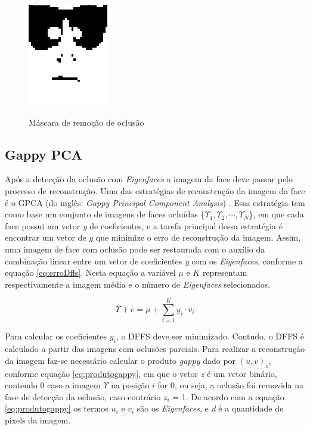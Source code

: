 \begin{figure}[H]
\centering
\caption{Máscara de remoção de oclusão}
\includegraphics[scale = 0.62]{imgs/mascara.png}
\label{fig:mascara}
\end{figure}




\subsection{Gappy PCA}
Após a detecção da oclusão com \textit{Eigenfaces} a imagem da face deve passar pelo processo de reconstrução. Uma das estratégias de reconstrução da imagem da face é o GPCA (do inglês: \textit{Gappy Principal Component Analysis}) \cite{colombo2009gappy}. Essa estratégia tem como base um conjunto de imagens de faces ocluídas \{$\Upsilon_1,\Upsilon_2, \cdots ,\Upsilon_N$\}, em que cada face possui um vetor \textit{y} de coeficientes, e a tarefa principal dessa estratégia é encontrar um vetor de $y$ que minimize o erro de reconstrução da imagem. Assim, uma imagem de face com oclusão pode ser restaurada com o auxílio da combinação linear entre um vetor de coeficientes \textit{y} com os \textit{Eigenfaces}, conforme a equação \ref{eq:erroDffs}. Nesta equação a variável $\mu$ e $K$ representam respectivamente a imagem média e o número de \textit{Eigenfaces} selecionados.


\begin{equation}
\Upsilon + e = \mu + \sum_{i=1}^{K}y_i \cdot v_i
\label{eq:erroDffs}
\end{equation}

Para calcular os coeficientes $y_i$, o DFFS  deve ser minimizado. Contudo, o DFFS é calculado a partir das imagens com oclusões parciais. Para realizar a reconstrução da imagem faz-se necessário calcular o produto \textit{gappy} dado por $(u,v)_z$, conforme equação \ref{eq:produtogappy}, em que o vetor \textit{z} é um vetor binário, contendo 0 caso a imagem $\Upsilon$ na posição $i$ for 0, ou seja, a oclusão foi removida na fase de detecção da oclusão, caso contrário $z_i$ = 1. De acordo com a equação \ref{eq:produtogappy} os termos $u_i$ e $v_i$ são os \textit{Eigenfaces}, e \textit{d} é a quantidade de pixels da imagem.


